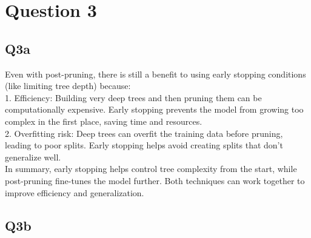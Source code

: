 \documentclass[12pt]{article}
\begin{document}
\newpage
\section{Question 3}
\subsection{Q3a}
\begin{tcolorbox}[myblock, title = Answer]
  Even with post-pruning, there is still a benefit to using early stopping conditions (like limiting tree depth) because:\\
1. Efficiency: Building very deep trees and then pruning them can be computationally expensive. Early stopping prevents the model from growing too complex in the first place, saving time and resources.\\
2. Overfitting risk: Deep trees can overfit the training data before pruning, leading to poor splits. Early stopping helps avoid creating splits that don't generalize well.\\

In summary, early stopping helps control tree complexity from the start, while post-pruning fine-tunes the model further. Both techniques can work together to improve efficiency and generalization.\\
\end{tcolorbox}



\newpage
\subsection{Q3b}  
\end{document}
